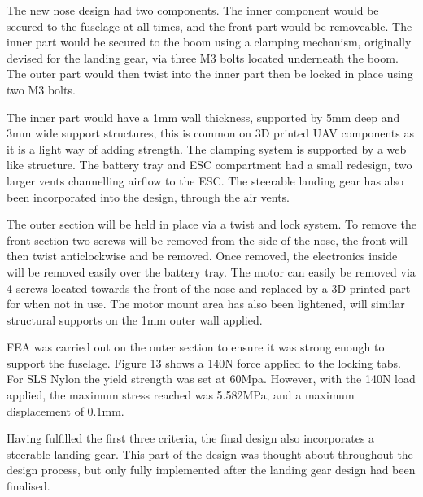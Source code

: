 \documentclass[../../main.tex]{subfiles}
\begin{document}
The new nose design had two components.
The inner component would be secured to the fuselage at all times, and the front part would be removeable.
The inner part would be secured to the boom using a clamping mechanism, originally devised for the landing gear, via three M3 bolts located underneath the boom.
The outer part would then twist into the inner part then be locked in place using two M3 bolts. 


The inner part would have a 1mm wall thickness, supported by 5mm deep and 3mm wide support structures, this is common on 3D printed UAV components as it is a light way of adding strength.
The clamping system is supported by a web like structure.
The battery tray and ESC compartment had a small redesign, two larger vents channelling airflow to the ESC.
The steerable landing gear has also been incorporated into the design, through the air vents. 


The outer section will be held in place via a twist and lock system.
To remove the front section two screws will be removed from the side of the nose, the front will then twist anticlockwise and be removed.
Once removed, the electronics inside will be removed easily over the battery tray.
The motor can easily be removed via 4 screws located towards the front of the nose and replaced by a 3D printed part for when not in use.
The motor mount area has also been lightened, will similar structural supports on the 1mm outer wall applied. 


FEA was carried out on the outer section to ensure it was strong enough to support the fuselage.
Figure 13 shows a 140N force applied to the locking tabs.
For SLS Nylon the yield strength was set at 60Mpa.
However, with the 140N load applied, the maximum stress reached was 5.582MPa, and a maximum displacement of 0.1mm. 

Having fulfilled the first three criteria, the final design also incorporates a steerable landing gear.
This part of the design was thought about throughout the design process, but only fully implemented after the landing gear design had been finalised. 

\end{document}
